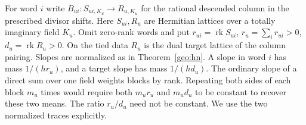 For word \(i\) write \(B_{ui}:S_{ui,K_u}\to R_{u,K_u}\) for the
rational descended column in the prescribed divisor shifts.
Here \(S_{ui},R_u\) are Hermitian lattices over a totally imaginary
field \(K_u\). Omit zero-rank words and put \(r_{ui}=\operatorname{rk}S_{ui}\),
\(r_u=\sum_i r_{ui}>0\), \(d_u=\operatorname{rk}R_u>0\). On the
tied data \(R_u\) is the dual target lattice of the column pairing. Slopes
are normalized as in Theorem~\ref{geo:hn}. A slope in word \(i\) has
mass \(1/(h r_u)\), and a target slope has mass \(1/(h d_u)\).
The ordinary slope of a direct sum over one field weights blocks by
rank. Repeating both sides of each block \(m_u\) times would require
both \(m_u r_u\) and \(m_u d_u\) to be constant to recover these
two means. The ratio \(r_u/d_u\) need not be constant. We use the
two normalized traces explicitly.

